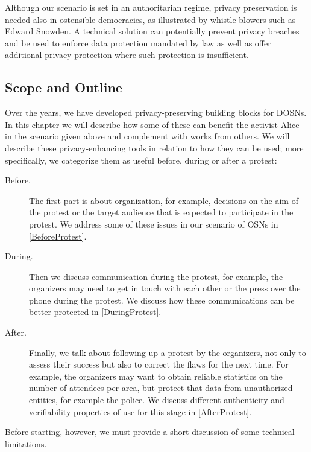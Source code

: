 Although our scenario is set in an authoritarian regime, privacy
preservation is needed also in ostensible democracies, as illustrated
by whistle-blowers such as Edward Snowden. 
A technical solution can potentially prevent privacy breaches and be
used to enforce data protection mandated by law as well as offer
additional privacy protection where such protection is insufficient.



\subsection{Scope and Outline}
\label{Outline}

Over the years, we have developed privacy-preserving building blocks for 
\acp{DOSN}.
In this chapter we will describe how some of these can benefit the activist 
Alice in the scenario given above and complement with works from others.
We will describe these privacy-enhancing tools in relation to how they can be 
used; more specifically, we categorize them as useful before, during or after 
a protest:
\begin{description}
  \item[Before.]
    The first part is about organization, for example, decisions on the aim of the protest or the 
    target audience that is expected to participate in the protest.
    We address some of these issues in our scenario of \acp{OSN} in 
    \cref{BeforeProtest}.

  \item[During.]
    Then we discuss communication during the protest, for example, the organizers may need to 
    get in touch with each other or the press over the phone during the protest.
    We discuss how these communications can be better protected in 
    \cref{DuringProtest}.

  \item[After.]
    Finally, we talk about following up a protest by the organizers, not only to assess their success 
    but also to correct the flaws for the next time.  For example, the 
    organizers may want to obtain reliable statistics on the number of 
    attendees per area, but protect that data from unauthorized
    entities, for example the police.
    We discuss different authenticity and verifiability properties of use for 
    this stage in \cref{AfterProtest}.
\end{description}

Before starting, however, we must provide a short discussion of some technical 
limitations.
